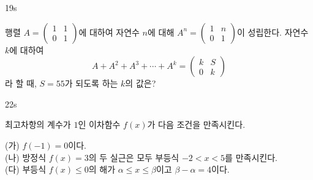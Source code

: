 \documentclass[10pt]{article}
\begin{document}
\begin{pagepair}
\noindent
\begin{minipage}[t][\probboxheight][t]{0.46\linewidth}
\begin{problem}{19}{s}
\par\smallskip
행렬 $A = \begin{pmatrix} 1 & 1 \\ 0 & 1 \end{pmatrix}$에 대하여 자연수 $n$에 대해 $A^n = \begin{pmatrix} 1 & n \\ 0 & 1 \end{pmatrix}$이 성립한다. 자연수 $k$에 대하여
\[ A + A^2 + A^3 + \cdots + A^k = \begin{pmatrix} k & S \\ 0 & k \end{pmatrix} \]
라 할 때, $S = 55$가 되도록 하는 $k$의 값은?
\begin{choices}
\end{choices}
\end{problem}
\end{minipage}\hfill
\begin{minipage}[t][\probboxheight][t]{0.46\linewidth}
\begin{problem}{22}{s}
\par\smallskip
최고차항의 계수가 $1$인 이차함수 $f(x)$가 다음 조건을 만족시킨다.
\begin{conditions}
(가) $f(-1) = 0$이다. \\[3pt]
(나) 방정식 $f(x) = 3$의 두 실근은 모두 부등식 $-2 < x < 5$를 만족시킨다. \\[3pt]
(다) 부등식 $f(x) \le 0$의 해가 $\alpha \le x \le \beta$이고 $\beta - \alpha = 4$이다.
\end{conditions}


\end{problem}
\end{minipage}
\end{pagepair}
\end{document}
